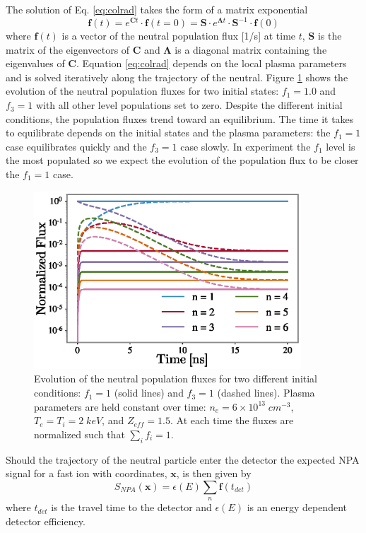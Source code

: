 The solution of Eq. \ref{eq:colrad} takes the form of a matrix exponential
\begin{equation} \label{eq:neutral_flux}
    \mathbf{f}(t) = e^{\mathbf{C} t} \cdot \mathbf{f}(t=0) = \mathbf{S} \cdot e^{\mathbf{\Lambda} t} \cdot \mathbf{S}^{-1} \cdot \mathbf{f}(0)
\end{equation}
where $\mathbf{f}(t)$ is a vector of the neutral population flux [1/s] at time $t$, $\mathbf{S}$ is the matrix of the eigenvectors of $\mathbf{C}$ and $\mathbf{\Lambda}$ is a diagonal matrix containing the eigenvalues of $\mathbf{C}$.
Equation \ref{eq:colrad} depends on the local plasma parameters and is solved iteratively along the trajectory of the neutral. Figure \ref{fig:f_evolution} shows the evolution of the neutral population fluxes for two initial states: $f_1 = 1.0$ and $f_3=1$ with all other level populations set to zero. Despite the different initial conditions, the population fluxes trend toward an equilibrium. The time it takes to equilibrate depends on the initial states and the plasma parameters: the $f_1=1$ case equilibrates quickly and the $f_3=1$ case slowly. In experiment the $f_1$ level is the most populated so we expect the evolution of the population flux to be closer the $f_1=1$ case.
\begin{figure}[ht]
    \centering
    \includegraphics[width=10cm]{figures/f_evolution.eps}
    \caption{Evolution of the neutral population fluxes for two different initial conditions: $f_1=1$ (solid lines) and $f_3=1$ (dashed lines). Plasma parameters are held constant over time: $n_e = 6\times10^{13}\;cm^{-3}$, $T_e=T_i = 2\;keV$, and $Z_{eff} = 1.5$. At each time the fluxes are normalized such that $\sum_i f_i = 1$.}
    \label{fig:f_evolution}
\end{figure}

Should the trajectory of the neutral particle enter the detector the expected NPA signal for a fast ion with coordinates, $\mathbf{x}$, is then given by
\begin{equation}\label{eq:npa_weight}
    S_{NPA}(\mathbf{x}) = \epsilon(E) \sum_n \mathbf{f}(t_{det})
\end{equation}
where $t_{det}$ is the travel time to the detector and $\epsilon(E)$ is an energy dependent detector efficiency.

